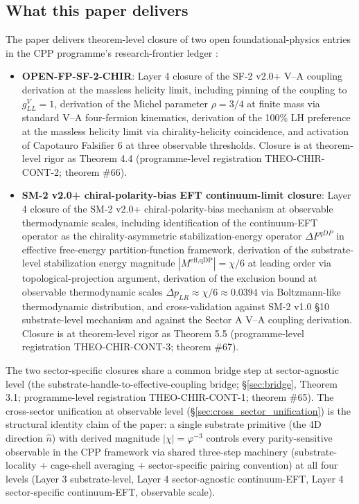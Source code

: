 \documentclass[11pt,letterpaper]{article}
\newcommand{\DeltapLR}{\Delta p_{LR}}
\newcommand{\DeltaFqDP}{\Delta F^{qDP}}
\begin{document}
\subsection{What this paper delivers}
\label{sec:what_delivered}

The paper delivers theorem-level closure of two open foundational-physics entries in the CPP programme's research-frontier ledger \cite{ResearchFrontier}:

\begin{itemize}[leftmargin=*]
\item \textbf{OPEN-FP-SF-2-CHIR}: Layer 4 closure of the SF-2 v2.0+ V--A coupling derivation at the massless helicity limit, including pinning of the coupling to $g^V_{LL} = 1$, derivation of the Michel parameter $\rho = 3/4$ at finite mass via standard V--A four-fermion kinematics, derivation of the 100\% LH preference at the massless helicity limit via chirality-helicity coincidence, and activation of Capotauro Falsifier 6 at three observable thresholds. Closure is at theorem-level rigor as Theorem 4.4 (programme-level registration THEO-CHIR-CONT-2; \cite{ResearchFrontier} theorem \#66).

\item \textbf{SM-2 v2.0+ chiral-polarity-bias EFT continuum-limit closure}: Layer 4 closure of the SM-2 v2.0+ chiral-polarity-bias mechanism at observable thermodynamic scales, including identification of the continuum-EFT operator as the chirality-asymmetric stabilization-energy operator $\DeltaFqDP$ in effective free-energy partition-function framework, derivation of the substrate-level stabilization energy magnitude $|M^{\text{eff,qDP}}| = \chi/6$ at leading order via topological-projection argument, derivation of the exclusion bound at observable thermodynamic scales $\DeltapLR \approx \chi/6 \approx 0.0394$ via Boltzmann-like thermodynamic distribution, and cross-validation against SM-2 v1.0 §10 substrate-level mechanism and against the Sector A V--A coupling derivation. Closure is at theorem-level rigor as Theorem 5.5 (programme-level registration THEO-CHIR-CONT-3; \cite{ResearchFrontier} theorem \#67).
\end{itemize}

The two sector-specific closures share a common bridge step at sector-agnostic level (the substrate-handle-to-effective-coupling bridge; §\ref{sec:bridge}, Theorem 3.1; programme-level registration THEO-CHIR-CONT-1; \cite{ResearchFrontier} theorem \#65). The cross-sector unification at observable level (§\ref{sec:cross_sector_unification}) is the structural identity claim of the paper: a single substrate primitive (the 4D direction $\hat{n}$) with derived magnitude $|\chi| = \varphi^{-3}$ controls every parity-sensitive observable in the CPP framework via shared three-step machinery (substrate-locality + cage-shell averaging + sector-specific pairing convention) at all four levels (Layer 3 substrate-level, Layer 4 sector-agnostic continuum-EFT, Layer 4 sector-specific continuum-EFT, observable scale).
\end{document}
